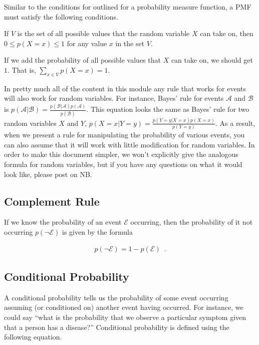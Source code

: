 \documentclass{tufte-handout}
\begin{document}
Similar to the conditions for outlined for a probability measure function, a PMF must satisfy the following conditions.
\be
\item If $V$ is the set of all possible values that the random variable $X$ can take on, then $0 \leq p(X = x) \leq 1$ for any value $x$ in the set $V$.
\item If we add the probability of all possible values that $X$ can take on, we should get $1$.  That is, $\sum_{x \in V} p(X = x) = 1$.
\ee

\begin{notice}
In pretty much all of the content in this module any rule that works for events will also work for random variables.  For instance, Bayes' rule for events $\mathcal{A}$ and $\mathcal{B}$ is $p(\mathcal{A} | \mathcal{B}) = \frac{p(\mathcal{B}|\mathcal{A}) p(\mathcal{A})}{p(\mathcal{B})}$.  This equation looks the same as Bayes' rule for two random variables $X$ and $Y$, $p(X=x | Y=y) = \frac{p(Y=y|X=x) p(X=x)}{p(Y=y)}$.  As a result, when we present a rule for manipulating the probability of various events, you can also assume that it will work with little modification for random variables.  In order to make this document simpler, we won't explicitly give the analogous formula for random variables, but if you have any questions on what it would look like, please post on NB.
\end{notice}

\subsection{Complement Rule}

If we know the probability of an event $\mathcal{E}$ occurring, then the probability of it not occurring $p(\neg \mathcal{E})$ is given by the formula

\begin{align}
p(\neg \mathcal{E}) = 1 - p(\mathcal{E}) \enspace .
\end{align}

\subsection{Conditional Probability}
A conditional probability tells us the probability of some event occurring assuming (or conditioned on) another event having occurred.  For instance, we could say ``what is the probability that we observe a particular symptom given that a person has a disease?''  Conditional probability is defined using the following equation.
\end{document}
